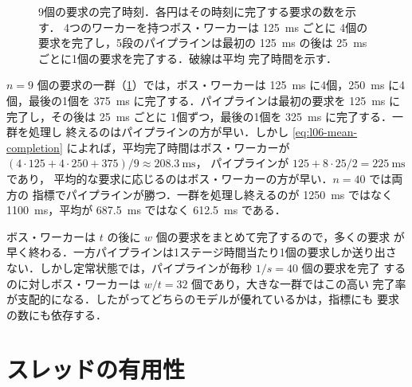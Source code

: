 \documentclass[../main.tex]{subfiles}
\begin{document}
\begin{figure}[htbp]
  \centering
  
  \caption{9個の要求の完了時刻．各円はその時刻に完了する要求の数を示す．
    4つのワーカーを持つボス・ワーカーは \SI{125}{\milli\second} ごとに
    4個の要求を完了し，5段のパイプラインは最初の \SI{125}{\milli\second}
    の後は \SI{25}{\milli\second} ごとに1個の要求を完了する．破線は平均
    完了時間を示す．}
  \label{fig:l06-completion}
\end{figure}

\begin{example}
  \label{ex:l06-completion}
  $n = 9$ 個の要求の一群（\cref{fig:l06-completion}）では，ボス・ワーカーは
  \SI{125}{\milli\second} に4個，\SI{250}{\milli\second} に4個，最後の1個を
  \SI{375}{\milli\second} に完了する．パイプラインは最初の要求を
  \SI{125}{\milli\second} に完了し，その後は \SI{25}{\milli\second} ごとに
  1個ずつ，最後の1個を \SI{325}{\milli\second} に完了する．一群を処理し
  終えるのはパイプラインの方が早い．しかし \cref{eq:l06-mean-completion}
  によれば，平均完了時間はボス・ワーカーが
  $(4 \cdot 125 + 4 \cdot 250 + 375)/9 \approx \SI{208.3}{\milli\second}$，
  パイプラインが $125 + 8 \cdot 25/2 = \SI{225}{\milli\second}$ であり，
  平均的な要求に応じるのはボス・ワーカーの方が早い．$n = 40$ では両方の
  指標でパイプラインが勝つ．一群を処理し終えるのが
  \SI{1250}{\milli\second} ではなく \SI{1100}{\milli\second}，平均が
  \SI{687.5}{\milli\second} ではなく \SI{612.5}{\milli\second} である．
\end{example}

ボス・ワーカーは $t$ の後に $w$ 個の要求をまとめて完了するので，多くの要求
が早く終わる．一方パイプラインは1ステージ時間当たり1個の要求しか送り出さ
ない．しかし定常状態では，パイプラインが毎秒 $1/s = 40$ 個の要求を完了
するのに対しボス・ワーカーは $w/t = 32$ 個であり，大きな一群ではこの高い
完了率が支配的になる．したがってどちらのモデルが優れているかは，指標にも
要求の数にも依存する．

\section{スレッドの有用性}
\label{sec:l06-useful}
\end{document}
